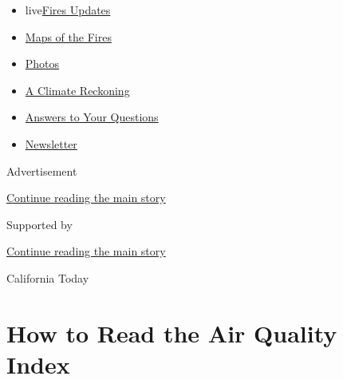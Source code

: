 \begin{itemize}
\tightlist
\item
  live\href{https://www.nytimes3xbfgragh.onion/2020/09/12/us/wildfires-live-updates.html?name=styln-california-wildfires\&region=TOP_BANNER\&block=storyline_menu_recirc\&action=click\&pgtype=Article\&impression_id=6dc09d41-f52b-11ea-9f60-c1748b5f940c\&variant=undefined}{Fires
  Updates}
\item
  \href{https://www.nytimes3xbfgragh.onion/interactive/2020/us/fires-map-tracker.html?name=styln-california-wildfires\&region=TOP_BANNER\&block=storyline_menu_recirc\&action=click\&pgtype=Article\&impression_id=6dc09d42-f52b-11ea-9f60-c1748b5f940c\&variant=undefined}{Maps
  of the Fires}
\item
  \href{https://www.nytimes3xbfgragh.onion/article/wildfires-photos-california-oregon-washington-state.html?name=styln-california-wildfires\&region=TOP_BANNER\&block=storyline_menu_recirc\&action=click\&pgtype=Article\&impression_id=6dc09d43-f52b-11ea-9f60-c1748b5f940c\&variant=undefined}{Photos}
\item
  \href{https://www.nytimes3xbfgragh.onion/2020/09/10/us/climate-change-california-wildfires.html?name=styln-california-wildfires\&region=TOP_BANNER\&block=storyline_menu_recirc\&action=click\&pgtype=Article\&impression_id=6dc09d44-f52b-11ea-9f60-c1748b5f940c\&variant=undefined}{A
  Climate Reckoning}
\item
  \href{https://www.nytimes3xbfgragh.onion/article/wildfires-california-oregon-washington.html?name=styln-california-wildfires\&region=TOP_BANNER\&block=storyline_menu_recirc\&action=click\&pgtype=Article\&impression_id=6dc09d45-f52b-11ea-9f60-c1748b5f940c\&variant=undefined}{Answers
  to Your Questions}
\item
  \href{https://www.nytimes3xbfgragh.onion/2020/09/09/us/california-wildfires.html?name=styln-california-wildfires\&region=TOP_BANNER\&block=storyline_menu_recirc\&action=click\&pgtype=Article\&impression_id=6dc09d46-f52b-11ea-9f60-c1748b5f940c\&variant=undefined}{Newsletter}
\end{itemize}

Advertisement

\protect\hyperlink{after-top}{Continue reading the main story}

Supported by

\protect\hyperlink{after-sponsor}{Continue reading the main story}

California Today

\hypertarget{how-to-read-the-air-quality-index}{%
\section{How to Read the Air Quality
Index}\label{how-to-read-the-air-quality-index}}

